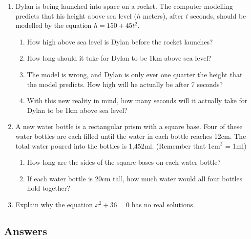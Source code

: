 \documentclass[a4paper,12pt]{article}
\begin{document}
\begin{enumerate}
\item Dylan is being launched into space on a rocket. The 
computer modelling predicts that his height above sea level 
($h$ meters), after $t$ seconds, should be modelled 
by the equation $h = 150 + 45t^2$.

\begin{enumerate}
    \item How high above sea level is Dylan before the rocket 
    launches?
    \item How long should it take for Dylan to be 1km above 
    sea level?
    \item The model is wrong, and Dylan is
    only ever one quarter the height that the model predicts.
    How high will he actually be after 7 seconds?
    \item With this new reality in mind, how many seconds will 
    it actually take for Dylan to be 1km above sea level?
\end{enumerate}

\item A new water bottle is a rectangular prism with a square base.
Four of these water bottles are each filled until the water
in each bottle reaches 12cm. The total water poured into the 
bottles is 1,452ml. (Remember that 1cm$^3$ = 1ml)

\begin{enumerate}
\item How long are the sides of the square bases on each 
water bottle?
\item If each water bottle is 20cm tall, how much water would 
all four bottles hold together?
\end{enumerate}

\item Explain why the equation $x^2 + 36 = 0$ has no 
real solutions.

\end{enumerate}

\newpage
\subsection*{Answers}
\end{document}
